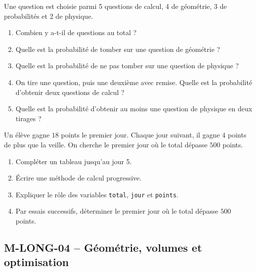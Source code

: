 \documentclass[11pt,a4paper]{article}
\newcounter{exercice}
\begin{document}
\begin{exercice}
Une question est choisie parmi 5 questions de calcul, 4 de géométrie, 3 de probabilités et 2 de physique.
\begin{enumerate}
  \item Combien y a-t-il de questions au total ?
  \item Quelle est la probabilité de tomber sur une question de géométrie ?
  \item Quelle est la probabilité de ne pas tomber sur une question de physique ?
  \item On tire une question, puis une deuxième avec remise. Quelle est la probabilité d'obtenir deux questions de calcul ?
  \item Quelle est la probabilité d'obtenir au moins une question de physique en deux tirages ?
\end{enumerate}
\end{exercice}

\begin{exercice}
Un élève gagne $18$ points le premier jour. Chaque jour suivant, il gagne $4$ points de plus que la veille. On cherche le premier jour où le total dépasse $500$ points.
\begin{enumerate}
  \item Compléter un tableau jusqu'au jour 5.
  \item Écrire une méthode de calcul progressive.
  \item Expliquer le rôle des variables \texttt{total}, \texttt{jour} et \texttt{points}.
  \item Par essais successifs, déterminer le premier jour où le total dépasse $500$ points.
\end{enumerate}
\end{exercice}
\newpage
\subsection{M-LONG-04 -- Géométrie, volumes et optimisation}
\end{document}
